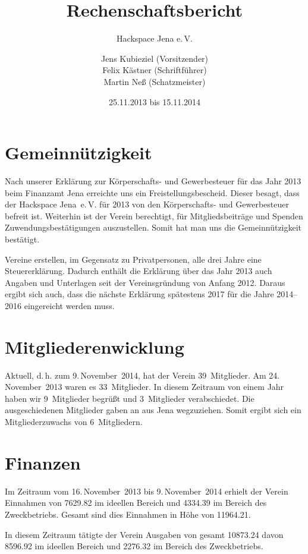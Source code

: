 \documentclass[ngerman,10pt,DIV16]{scrartcl}
\title{Rechenschaftsbericht}
\subtitle{Hackspace Jena e.\,V.}
\author{%
	Jens Kubieziel (Vorsitzender)\\
    Felix Kästner (Schriftführer)\\
	Martin Neß (Schatzmeister)
}
\date{25.11.2013 bis 15.11.2014}
\begin{document}
\maketitle{}

\tableofcontents{}

\newpage{}

\section{Gemeinnützigkeit}

Nach unserer Erklärung zur Körperschafts- und Gewerbesteuer für das Jahr 2013 beim Finanzamt Jena
erreichte uns ein Freistellungsbescheid.
Dieser besagt, dass der Hackspace Jena~e.\,V. für 2013 von den Körperschafts- und Gewerbesteuer befreit ist. Weiterhin ist der Verein berechtigt, für Mitgliedsbeiträge und Spenden Zuwendungsbestätigungen auszustellen.
Somit hat man uns die Gemeinnützigkeit bestätigt.

Vereine erstellen, im Gegensatz zu Privatpersonen, alle drei Jahre eine Steuererklärung.
Dadurch enthält die Erklärung über das Jahr 2013 auch Angaben und Unterlagen seit der Vereinsgründung von Anfang 2012.
Daraus ergibt sich auch, dass die nächste Erklärung spätestens 2017 für die Jahre 2014--2016 eingereicht werden muss.

\section{Mitgliederenwicklung}

Aktuell, d.\,h. zum 9.\,November~2014, hat der Verein 39~Mitglieder. Am 24.\,November~2013 waren es 33~Mitglieder.
In diesem Zeitraum von einem Jahr haben wir 9~Mitglieder begrüßt und 3~Mitglieder verabschiedet. Die ausgeschiedenen Mitglieder gaben an aus Jena wegzuziehen.
Somit ergibt sich ein Mitgliederzuwachs von 6~Mitgliedern.

\section{Finanzen}

Im Zeitraum vom 16.\,November~2013 bis 9.\,November~2014 erhielt der Verein Einnahmen von \SI{7629,82}{\EUR} im ideellen Bereich und \SI{4334,39}{\EUR} im Bereich des Zweckbetriebs.
Gesamt sind dies Einnahmen in Höhe von \SI{11964,21}{\EUR}.


In diesem Zeitraum tätigte der Verein Ausgaben von gesamt \SI{10873,24}{\EUR} davon \SI{8596,92}{\EUR} im ideellen Bereich und \SI{2276,32}{\EUR} im Bereich des Zweckbetriebs.
\end{document}
